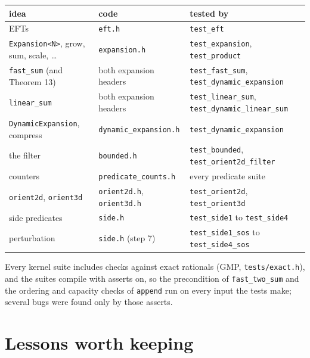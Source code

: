 \documentclass[11pt,a4paper]{article}
\newcommand{\code}[1]{\texttt{#1}}
\theoremstyle{definition}
\theoremstyle{remark}
\begin{document}
\begin{center}
\begin{tabularx}{\linewidth}{@{}l l L@{}}
  \toprule
  idea & code & tested by \\
  \midrule
  EFTs & \code{eft.h} & \code{test\_eft} \\
  \code{Expansion<N>}, grow, sum, scale, \dots & \code{expansion.h} & \code{test\_expansion},
    \code{test\_product} \\
  \code{fast\_sum} (and Theorem 13) & both expansion headers & \code{test\_fast\_sum},
    \code{test\_dynamic\_expansion} \\
  \code{linear\_sum} & both expansion headers & \code{test\_linear\_sum},
    \code{test\_dynamic\_linear\_sum} \\
  \code{DynamicExpansion}, compress & \code{dynamic\_expansion.h} & \code{test\_dynamic\_expansion} \\
  the filter & \code{bounded.h} & \code{test\_bounded}, \code{test\_orient2d\_filter} \\
  counters & \code{predicate\_counts.h} & every predicate suite \\
  \code{orient2d}, \code{orient3d} & \code{orient2d.h}, \code{orient3d.h} & \code{test\_orient2d},
    \code{test\_orient3d} \\
  side predicates & \code{side.h} & \code{test\_side1} to \code{test\_side4} \\
  perturbation & \code{side.h} (step 7) & \code{test\_side1\_sos} to \code{test\_side4\_sos} \\
  \bottomrule
\end{tabularx}
\end{center}
Every kernel suite includes checks against exact rationals (GMP, \code{tests/exact.h}), and the
suites compile with asserts on, so the precondition of \code{fast\_two\_sum} and the ordering and
capacity checks of \code{append} run on every input the tests make; several bugs were found only by
those asserts.

\section{Lessons worth keeping}\label{sec:lessons}
\end{document}
